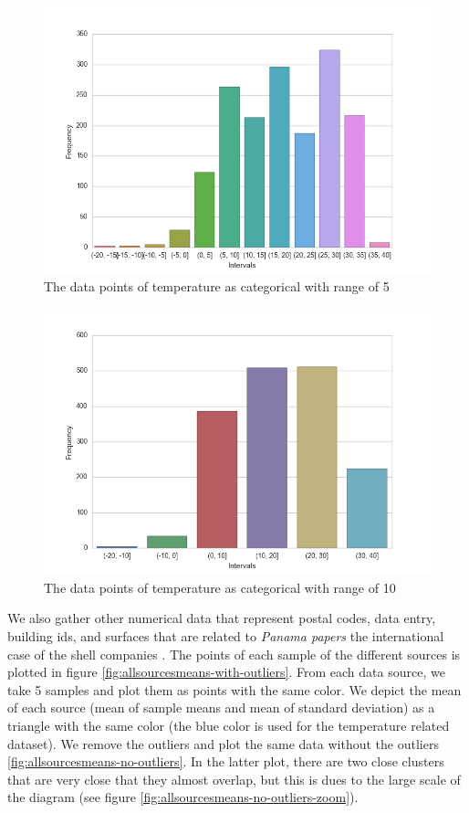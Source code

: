 \documentclass{article}
\begin{document}
\begin{figure}[!ht]
  \caption{The data points of temperature as categorical with range of 5}
  \centering
    \includegraphics[width=1.0\textwidth]{range5}
\end{figure}

\begin{figure}[!ht]
  \caption{The data points of temperature as categorical with range of 10}
  \centering
    \includegraphics[width=1.0\textwidth]{range10}
\end{figure}

We also gather other numerical data that represent postal codes, data entry, building ids, and surfaces that are related to \textit{Panama papers} the international case of the shell companies \cite{panama}. The points of each sample of the different sources is plotted in figure \ref{fig:allsourcesmeans-with-outliers}. From each data source, we take 5 samples and plot them as points with the same color. We depict the mean of each source (mean of sample means and mean of standard deviation) as a triangle with the same color (the blue color is used for the temperature related dataset). We remove the outliers and plot the same data without the outliers \ref{fig:allsourcesmeans-no-outliers}. In the latter plot, there are two close clusters that are very close that they almost overlap, but this is dues to the large scale of the diagram (see figure \ref{fig:allsourcesmeans-no-outliers-zoom}).
\end{document}
